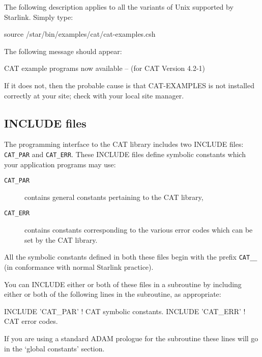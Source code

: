 \documentclass[11pt,twoside]{starlink}
\begin{document}
The following description applies to all the variants of Unix supported
by Starlink.  Simply type:

\begin{terminalv}
source /star/bin/examples/cat/cat-examples.csh
\end{terminalv}

The following message should appear:

\begin{terminalv}
CAT example programs now available -- (for CAT Version 4.2-1)
\end{terminalv}

If it does not, then the probable cause is that CAT-EXAMPLES is not
installed correctly at your site; check with your local site manager.

\subsection{\label{INCLUDE}INCLUDE files}

The programming interface to the CAT library includes two INCLUDE files:
\texttt{CAT\_PAR} and \texttt{CAT\_ERR}. These INCLUDE files define symbolic
constants which your application programs may use:

\begin{description}

  \item[\texttt{CAT\_PAR}] contains general constants pertaining to the
   CAT library,

  \item[\texttt{CAT\_ERR}] contains constants corresponding to the various
   error codes which can be set by the CAT library.

\end{description}

All the symbolic constants defined in both these files begin with the
prefix \texttt{CAT\_\_} (in conformance with normal Starlink practice).

You can INCLUDE either or both of these files in a subroutine by
including either or both of the following lines in the subroutine,
as appropriate:

\begin{terminalv}
INCLUDE 'CAT_PAR'   ! CAT symbolic constants.
INCLUDE 'CAT_ERR'   ! CAT error codes.
\end{terminalv}

If you are using a standard ADAM prologue for the subroutine these
lines will go in the `global constants' section.
\end{document}
